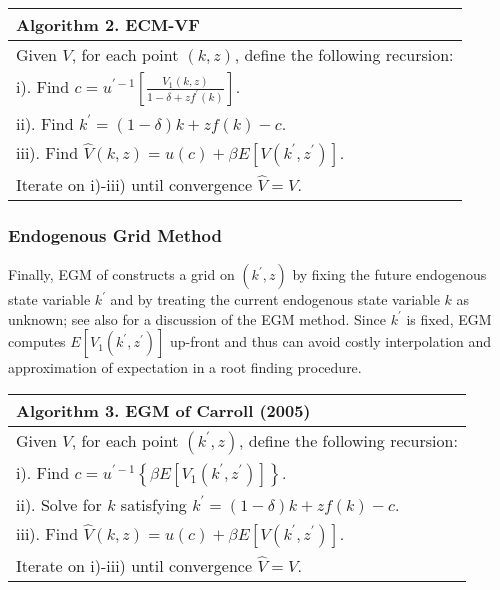 \qquad \newline

{\small
\begin{tabular}{l}
\hline \hline
\textbf{Algorithm 2. ECM-VF} \\ \hline
Given $V$, for each point $\left( k,z\right) $, define the following recursion: \\
\quad i). Find $c=u^{\prime -1}\left[ \frac{V_{1}\left( k,z\right) }{1-\delta +zf^{\prime }\left( k\right) }\right]$. \\
\quad ii). Find $k^{\prime }=\left( 1-\delta \right) k+zf\left( k\right) -c$. \\
\quad iii). Find $\widehat{V}\left( k,z\right) =u\left( c\right) +\beta E \left[ V\left( k^{\prime },z^{\prime }\right) \right]$. \\
Iterate on i)-iii) until convergence $\widehat{V}=V$. \\ \hline \hline
\end{tabular}
}

\qquad \newline

\subsubsection{Endogenous Grid Method}

Finally, EGM of \cite{Carroll2006} constructs a grid on $\left( k^{\prime
},z\right) $ by fixing the future endogenous state variable $k^{\prime }$ and
by treating the current endogenous state variable $k$ as unknown; see also
\cite{BF2007} for a discussion of the EGM method. Since $k^{\prime }$ is fixed,
EGM computes $E\left[ V_{1}\left( k^{\prime },z^{\prime }\right) \right] $
up-front and thus can avoid costly interpolation and approximation of
expectation in a root finding procedure.

\qquad \newline

{\small
\begin{tabular}{l}
\hline \hline
\textbf{Algorithm 3. EGM of Carroll (2005)} \\ \hline
Given $V$, for each point $\left( k^{\prime },z\right) $, define the
following recursion: \\
\quad i). Find $c=u^{\prime -1}\left \{ \beta E\left[ V_{1}\left( k^{\prime}, z^{\prime }\right) \right] \right \}$. \\
\quad ii). Solve for $k$ satisfying $k^{\prime }=\left( 1-\delta \right)k + zf\left(k\right) - c$. \\
\quad iii). Find $\widehat{V}\left( k,z\right) =u\left( c\right) +\beta E \left[ V\left( k^{\prime },z^{\prime }\right) \right]$. \\
Iterate on i)-iii) until convergence $\widehat{V}=V$. \\ \hline \hline
\end{tabular}%
}

